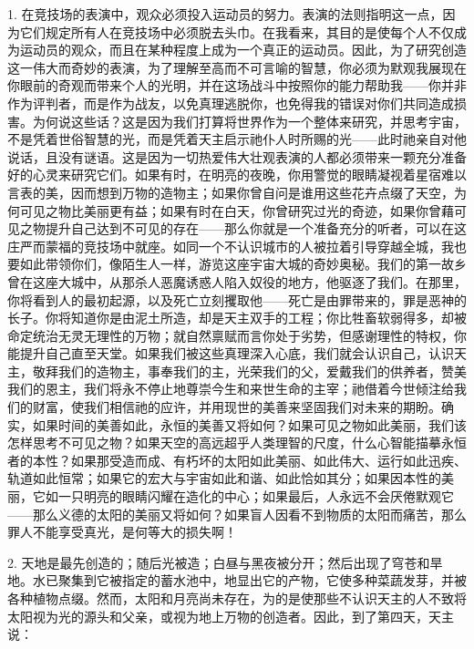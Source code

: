 1. 在竞技场的表演中，观众必须投入运动员的努力。表演的法则指明这一点，因为它们规定所有人在竞技场中必须脱去头巾。在我看来，其目的是使每个人不仅成为运动员的观众，而且在某种程度上成为一个真正的运动员。因此，为了研究创造这一伟大而奇妙的表演，为了理解至高而不可言喻的智慧，你必须为默观我展现在你眼前的奇观而带来个人的光明，并在这场战斗中按照你的能力帮助我——你并非作为评判者，而是作为战友，以免真理逃脱你，也免得我的错误对你们共同造成损害。为何说这些话？这是因为我们打算将世界作为一个整体来研究，并思考宇宙，不是凭着世俗智慧的光，而是凭着天主启示祂仆人时所赐的光——此时祂亲自对他说话，且没有谜语。这是因为一切热爱伟大壮观表演的人都必须带来一颗充分准备好的心灵来研究它们。如果有时，在明亮的夜晚，你用警觉的眼睛凝视着星宿难以言表的美，因而想到万物的造物主；如果你曾自问是谁用这些花卉点缀了天空，为何可见之物比美丽更有益；如果有时在白天，你曾研究过光的奇迹，如果你曾藉可见之物提升自己达到不可见的存在——那么你就是一个准备充分的听者，可以在这庄严而蒙福的竞技场中就座。如同一个不认识城市的人被拉着引导穿越全城，我也要如此带领你们，像陌生人一样，游览这座宇宙大城的奇妙奥秘。我们的第一故乡曾在这座大城中，从那杀人恶魔诱惑人陷入奴役的地方，他驱逐了我们。在那里，你将看到人的最初起源，以及死亡立刻攫取他——死亡是由罪带来的，罪是恶神的长子。你将知道你是由泥土所造，却是天主双手的工程；你比牲畜软弱得多，却被命定统治无灵无理性的万物；就自然禀赋而言你处于劣势，但感谢理性的特权，你能提升自己直至天堂。如果我们被这些真理深入心底，我们就会认识自己，认识天主，敬拜我们的造物主，事奉我们的主，光荣我们的父，爱戴我们的供养者，赞美我们的恩主，我们将永不停止地尊崇今生和来世生命的主宰；祂借着今世倾注给我们的财富，使我们相信祂的应许，并用现世的美善来坚固我们对未来的期盼。确实，如果时间的美善如此，永恒的美善又将如何？如果可见之物如此美丽，我们该怎样思考不可见之物？如果天空的高远超乎人类理智的尺度，什么心智能描摹永恒者的本性？如果那受造而成、有朽坏的太阳如此美丽、如此伟大、运行如此迅疾、轨道如此恒常；如果它的宏大与宇宙如此和谐、如此恰如其分；如果因本性的美丽，它如一只明亮的眼睛闪耀在造化的中心；如果最后，人永远不会厌倦默观它——那么义德的太阳的美丽又将如何？如果盲人因看不到物质的太阳而痛苦，那么罪人不能享受真光，是何等大的损失啊！\par

2.  天地是最先创造的；随后光被造；白昼与黑夜被分开；然后出现了穹苍和旱地。水已聚集到它被指定的蓄水池中，地显出它的产物，它使多种菜蔬发芽，并被各种植物点缀。然而，太阳和月亮尚未存在，为的是使那些不认识天主的人不致将太阳视为光的源头和父亲，或视为地上万物的创造者。因此，到了第四天，天主说：\par

